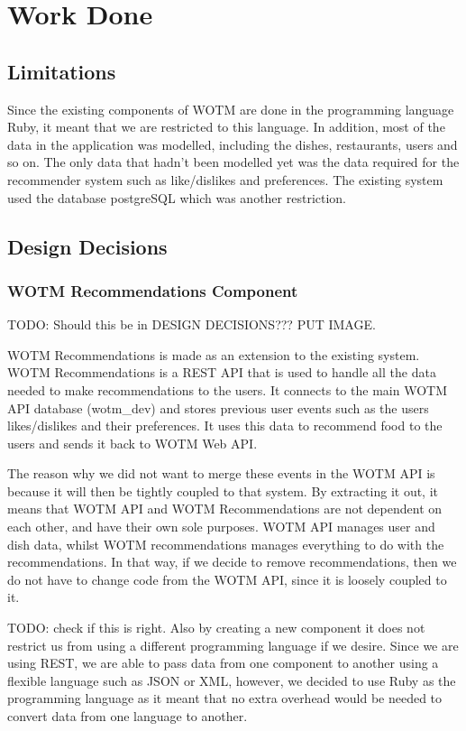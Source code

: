 \chapter{Work Done}\label{C:work_done}

\section{Limitations}

Since the existing components of WOTM are done in the programming language Ruby, it meant that we are restricted to this language. In addition, most of the data in the application was modelled, including the dishes, restaurants, users and so on. The only data that hadn't been modelled yet was the data required for the recommender system such as like/dislikes and preferences. The existing system used the database postgreSQL which was another restriction.  

\section{Design Decisions}

\subsection{WOTM Recommendations Component}
TODO: Should this be in DESIGN DECISIONS???
PUT IMAGE.

WOTM Recommendations is made as an extension to the existing system. WOTM Recommendations is a REST API that is used to handle all the data needed to make recommendations to the users. It connects to the main WOTM API database (wotm\_dev) and stores previous user events such as the users likes/dislikes and their preferences. It uses this data to recommend food to the users and sends it back to WOTM Web API. 

The reason why we did not want to merge these events in the WOTM API is because it will then be tightly coupled to that system. By extracting it out, it means that WOTM API and WOTM Recommendations are not dependent on each other, and have their own sole purposes. WOTM API manages user and dish data, whilst WOTM recommendations manages everything to do with the recommendations. In that way, if we decide to remove recommendations, then we do not have to change code from the WOTM API, since it is loosely coupled to it. 

TODO: check if this is right.
Also by creating a new component it does not restrict us from using a different programming language if we desire. Since we are using REST, we are able to pass data from one component to another using a flexible language such as JSON or XML, however, we decided to use Ruby as the programming language as it meant that no extra overhead would be needed to convert data from one language to another. 

